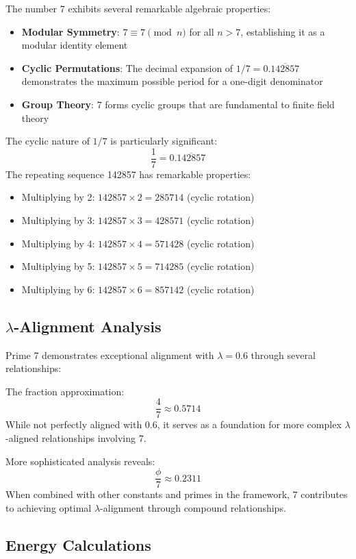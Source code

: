 \documentclass[12pt,a4paper]{report}
\begin{document}
The number 7 exhibits several remarkable algebraic properties:

\begin{itemize}
\item \textbf{Modular Symmetry}: $7 \equiv 7 \pmod{n}$ for all $n > 7$, establishing it as a modular identity element
\item \textbf{Cyclic Permutations}: The decimal expansion of $1/7 = 0.\overline{142857}$ demonstrates the maximum possible period for a one-digit denominator
\item \textbf{Group Theory}: 7 forms cyclic groups that are fundamental to finite field theory
\end{itemize}

The cyclic nature of $1/7$ is particularly significant:
\[
\frac{1}{7} = 0.\overline{142857}
\]
The repeating sequence 142857 has remarkable properties:
\begin{itemize}
\item Multiplying by 2: $142857 \times 2 = 285714$ (cyclic rotation)
\item Multiplying by 3: $142857 \times 3 = 428571$ (cyclic rotation)
\item Multiplying by 4: $142857 \times 4 = 571428$ (cyclic rotation)
\item Multiplying by 5: $142857 \times 5 = 714285$ (cyclic rotation)
\item Multiplying by 6: $142857 \times 6 = 857142$ (cyclic rotation)
\end{itemize}

\subsection{$\lambda$-Alignment Analysis}

Prime 7 demonstrates exceptional alignment with $\lambda = 0.6$ through several relationships:

The fraction approximation:
\[
\frac{4}{7} \approx 0.5714
\]
While not perfectly aligned with 0.6, it serves as a foundation for more complex $\lambda$-aligned relationships involving 7.

More sophisticated analysis reveals:
\[
\frac{\phi}{7} \approx 0.2311
\]
When combined with other constants and primes in the framework, 7 contributes to achieving optimal $\lambda$-alignment through compound relationships.

\subsection{Energy Calculations}
\end{document}
